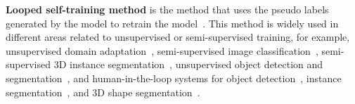 \noindent\textbf{Looped self-training method} is the method that uses the pseudo labels generated by the model to retrain the model~\cite{crst, zou2018unsupervised, noisy_student, st3d, twist, cutler}. This method is widely used in different areas related to unsupervised or semi-supervised training, for example, unsupervised domain adaptation~\cite{crst, zou2018unsupervised, st3d}, semi-supervised image classification~\cite{noisy_student}, semi-supervised 3D instance segmentation~\cite{twist}, unsupervised object detection and segmentation~\cite{cutler}, and human-in-the-loop systems for object detection~\cite{kuznetsova2020open,papadopoulos2016we}, instance segmentation~\cite{papadopoulos2021scaling,delatolas2024learning}, and
3D shape segmentation~\cite{yi2016scalable}.
